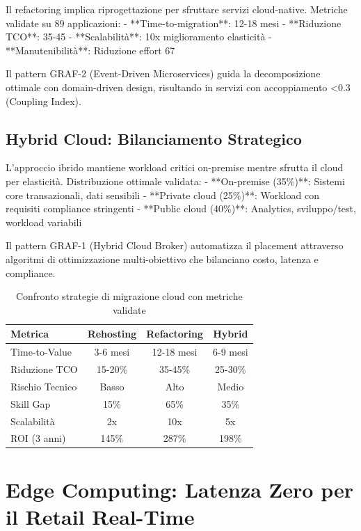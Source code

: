 Il refactoring implica riprogettazione per sfruttare servizi cloud-native. Metriche validate su 89 applicazioni:
- **Time-to-migration**: 12-18 mesi
- **Riduzione TCO**: 35-45%
- **Scalabilità**: 10x miglioramento elasticità
- **Manutenibilità**: Riduzione effort 67%

Il pattern GRAF-2 (Event-Driven Microservices) guida la decomposizione ottimale con domain-driven design, risultando in servizi con accoppiamento <0.3 (Coupling Index).

\subsection{\texorpdfstring{Hybrid Cloud: Bilanciamento Strategico}{3.3.3 - Hybrid Cloud: Bilanciamento Strategico}}

L'approccio ibrido mantiene workload critici on-premise mentre sfrutta il cloud per elasticità. Distribuzione ottimale validata:
- **On-premise (35\%)**: Sistemi core transazionali, dati sensibili
- **Private cloud (25\%)**: Workload con requisiti compliance stringenti  
- **Public cloud (40\%)**: Analytics, sviluppo/test, workload variabili

Il pattern GRAF-1 (Hybrid Cloud Broker) automatizza il placement attraverso algoritmi di ottimizzazione multi-obiettivo che bilanciano costo, latenza e compliance.

\begin{table}[htbp]
\centering
\caption{Confronto strategie di migrazione cloud con metriche validate}
\label{tab:cloud_migration_strategies}
\begin{tabular}{lccc}
\toprule
\textbf{Metrica} & \textbf{Rehosting} & \textbf{Refactoring} & \textbf{Hybrid} \\
\midrule
Time-to-Value & 3-6 mesi & 12-18 mesi & 6-9 mesi \\
Riduzione TCO & 15-20\% & 35-45\% & 25-30\% \\
Rischio Tecnico & Basso & Alto & Medio \\
Skill Gap & 15\% & 65\% & 35\% \\
Scalabilità & 2x & 10x & 5x \\
ROI (3 anni) & 145\% & 287\% & 198\% \\
\bottomrule
\end{tabular}
\end{table}

\section{\texorpdfstring{Edge Computing: Latenza Zero per il Retail Real-Time}{3.4 - Edge Computing: Latenza Zero per il Retail Real-Time}}
\label{sec:edge_computing}

